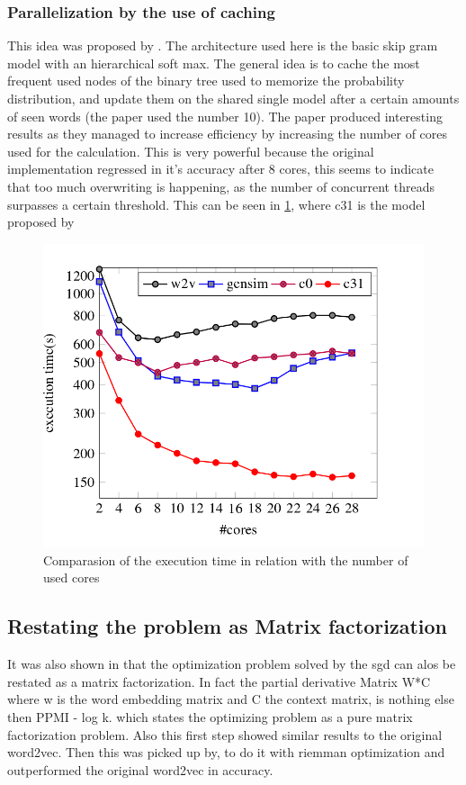\subsubsection{Parallelization by the use of caching}
This idea was proposed by \cite{efficient}. The architecture used here is the basic skip gram model with an hierarchical soft max.  The general idea is to cache the most frequent used nodes of the binary tree used to memorize the probability distribution, and update them on the shared single model after a certain amounts of seen words (the paper used the number 10). The paper produced interesting results as they managed to increase efficiency by increasing the number of cores used for the calculation. This is very powerful because the original implementation regressed in it's accuracy after 8 cores, this seems to indicate that too much overwriting is happening, as the number of concurrent threads surpasses a certain threshold. This can be seen in \ref{fig:efficient}, where c31 is the model proposed by \cite{efficient}
\begin{figure}[ht]
    \centering
			\includegraphics[scale=0.3]{images/cachingEfficiency.png} 
    \caption{Comparasion of the execution time in relation with the number of used cores \cite{efeficient}}
    \label{fig:efficient}
\end{figure}

\subsection{Restating the problem as Matrix factorization}
It was also shown in \cite{goldenberger} that the optimization problem solved by the sgd can alos be restated as a matrix factorization. In fact the partial derivative Matrix W*C where w is the word embedding matrix and C the context matrix, is nothing else then PPMI - log k. which states the optimizing problem as a pure matrix factorization problem. Also this first step showed similar results to the original word2vec. Then this was picked up by, to do it with riemman  optimization and outperformed the original word2vec in accuracy. 

